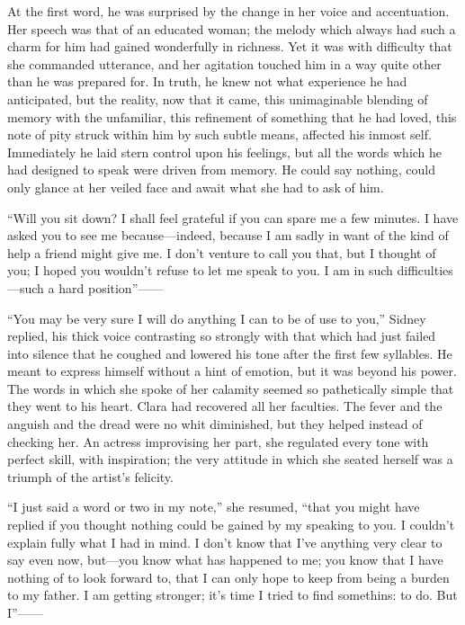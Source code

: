 At the first word, he was surprised by the change in her voice and
accentuation. Her speech was that of an educated woman; the melody which
always had such a charm for him had gained wonderfully in richness. Yet
it was with difficulty that she commanded utterance, and her agitation
touched him in a way quite other than he was prepared for. In
{\protect\hypertarget{79}{}{}}truth, he knew not what experience he had
anticipated, but the reality, now that it came, this unimaginable
blending of memory with the unfamiliar, this refinement of something
that he had loved, this note of pity struck within him by such subtle
means, affected his inmost self. Immediately he laid stern control upon
his feelings, but all the words which he had designed to speak were
driven from memory. He could say nothing, could only glance at her
veiled face and await what she had to ask of him.

``Will you sit down? I shall feel grateful if you can spare me a few
minutes. I have asked you to see me because---indeed, because I am sadly
in want of the kind of help a friend might give me. I don't venture to
call you that, but I thought of you; I hoped you wouldn't refuse to let
me speak to you. I am in such difficulties---such a hard
position''{{------}}

``You may be very sure I will do anything I can to be of use to you,''
Sidney replied, his thick voice contrasting so strongly with that which
had just failed into silence that he coughed and lowered his tone after
the first few syllables. He meant to express himself
{\protect\hypertarget{80}{}{}}without a hint of emotion, but it was
beyond his power. The words in which she spoke of her calamity seemed so
pathetically simple that they went to his heart. Clara had recovered all
her faculties. The fever and the anguish and the dread were no whit
diminished, but they helped instead of checking her. An actress
improvising her part, she regulated every tone with perfect skill, with
inspiration; the very attitude in which she seated herself was a triumph
of the artist's felicity.

``I just said a word or two in my note,'' she resumed, ``that you might
have replied if you thought nothing could be gained by my speaking to
you. I couldn't explain fully what I had in mind. I don't know that I've
anything very clear to say even now, but---you know what has happened to
me; you know that I have nothing of to look forward to, that I can only
hope to keep from being a burden to my father. I am getting stronger;
it's time I tried to find somethins: to do. But I''{{------}}

